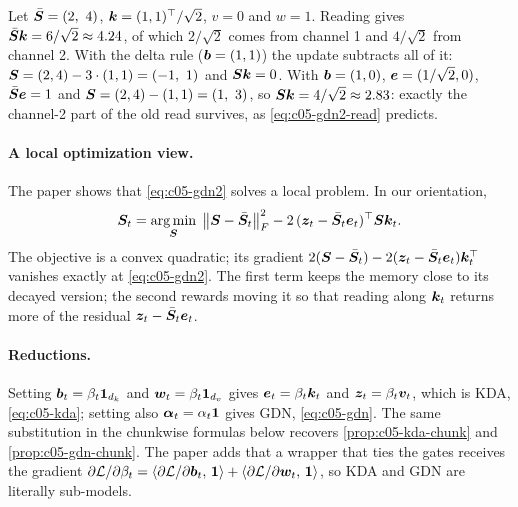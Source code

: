 \begin{example}[Partial erasure, $d_k = 2$, $d_v = 1$]
Let $\bar{\bm{S}} = (2,\ 4)$, $\bm{k} = (1,1)^{\top}/\sqrt2$, $v = 0$ and $w = 1$. Reading gives
$\bar{\bm{S}}\bm{k} = 6/\sqrt2 \approx 4.24$, of which $2/\sqrt2$ comes from channel 1 and $4/\sqrt2$ from
channel 2. With the delta rule ($\bm{b} = (1,1)$) the update subtracts all of it:
$\bm{S} = (2,4) - 3\cdot(1,1) = (-1,\ 1)$ and $\bm{S}\bm{k} = 0$. With $\bm{b} = (1,0)$, $\bm{e} = (1/\sqrt2, 0)$,
$\bar{\bm{S}}\bm{e} = 1$ and $\mS = (2,4) - (1,1) = (1,\ 3)$, so $\bm{S}\bm{k} = 4/\sqrt2 \approx 2.83$: exactly
the channel-2 part of the old read survives, as \cref{eq:c05-gdn2-read} predicts.
\end{example}

\paragraph{A local optimization view.} The paper shows that \cref{eq:c05-gdn2} solves a local
problem. In our orientation,
\begin{equation}\label{eq:c05-gdn2-obj}
  \bm{S}_t = \operatorname*{arg\,min}_{\bm{S}}\; \left\lVert \bm{S} - \bar{\bm{S}}_t\right\rVert_F^2 - 2\,(\bm{z}_t - \bar{\bm{S}}_t\bm{e}_t)^{\top}\bm{S}\bm{k}_t .
\end{equation}
The objective is a convex quadratic; its gradient $2(\bm{S} - \bar{\bm{S}}_t) - 2(\bm{z}_t - \bar{\bm{S}}_t\bm{e}_t)\bm{k}_t^{\top}$
vanishes exactly at \cref{eq:c05-gdn2}. The first term keeps the memory close to its decayed
version; the second rewards moving it so that reading along $\bm{k}_t$ returns more of the residual
$\bm{z}_t - \bar{\bm{S}}_t\bm{e}_t$.

\paragraph{Reductions.} Setting $\bm{b}_t = \beta_t\mathbf 1_{d_k}$ and $\bm{w}_t = \beta_t\mathbf 1_{d_v}$
gives $\bm{e}_t = \beta_t\bm{k}_t$ and $\bm{z}_t = \beta_t\bm{v}_t$, which is KDA, \cref{eq:c05-kda}; setting
also $\bm{\alpha}_t = \alpha_t\mathbf 1$ gives GDN, \cref{eq:c05-gdn}. The same substitution in the
chunkwise formulas below recovers \cref{prop:c05-kda-chunk} and \cref{prop:c05-gdn-chunk}. The
paper adds that a wrapper that ties the gates receives the gradient
$\partial\mathcal{L}/\partial\beta_t = \left\langle \partial\mathcal{L}/\partial\bm{b}_t,\, \mathbf 1\right\rangle +
\left\langle \partial\mathcal{L}/\partial\bm{w}_t,\, \mathbf 1\right\rangle$, so KDA and GDN are literally sub-models.

